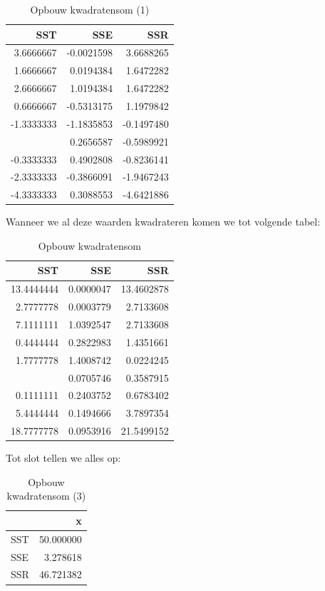 \documentclass[
]{book}
\theoremstyle{definition}
\theoremstyle{definition}
\theoremstyle{definition}
\theoremstyle{definition}
\theoremstyle{remark}
\begin{document}
\begin{table}

\caption{\label{tab:unnamed-chunk-10}Opbouw kwadratensom (1)}
\centering
\begin{tabular}[t]{rrr}
\toprule
SST & SSE & SSR\\
\midrule
3.6666667 & -0.0021598 & 3.6688265\\
1.6666667 & 0.0194384 & 1.6472282\\
2.6666667 & 1.0194384 & 1.6472282\\
0.6666667 & -0.5313175 & 1.1979842\\
-1.3333333 & -1.1835853 & -0.1497480\\
\addlinespace
-0.3333333 & 0.2656587 & -0.5989921\\
-0.3333333 & 0.4902808 & -0.8236141\\
-2.3333333 & -0.3866091 & -1.9467243\\
-4.3333333 & 0.3088553 & -4.6421886\\
\bottomrule
\end{tabular}
\end{table}

Wanneer we al deze waarden kwadrateren komen we tot volgende tabel:

\begin{table}

\caption{\label{tab:unnamed-chunk-11}Opbouw kwadratensom}
\centering
\begin{tabular}[t]{rrr}
\toprule
SST & SSE & SSR\\
\midrule
13.4444444 & 0.0000047 & 13.4602878\\
2.7777778 & 0.0003779 & 2.7133608\\
7.1111111 & 1.0392547 & 2.7133608\\
0.4444444 & 0.2822983 & 1.4351661\\
1.7777778 & 1.4008742 & 0.0224245\\
\addlinespace
0.1111111 & 0.0705746 & 0.3587915\\
0.1111111 & 0.2403752 & 0.6783402\\
5.4444444 & 0.1494666 & 3.7897354\\
18.7777778 & 0.0953916 & 21.5499152\\
\bottomrule
\end{tabular}
\end{table}

Tot slot tellen we alles op:

\begin{table}

\caption{\label{tab:unnamed-chunk-12}Opbouw kwadratensom (3)}
\centering
\begin{tabular}[t]{lr}
\toprule
  & x\\
\midrule
SST & 50.000000\\
SSE & 3.278618\\
SSR & 46.721382\\
\bottomrule
\end{tabular}
\end{table}
\end{document}
